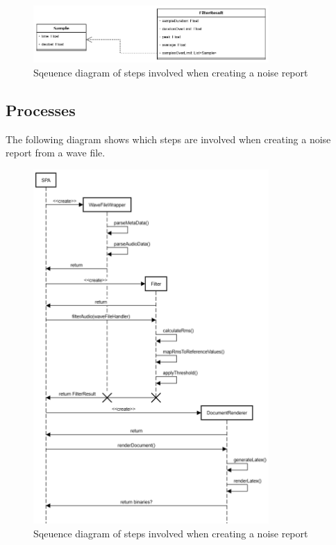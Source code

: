 \begin{figure}[H]
    \centering
    \includegraphics[width=0.8\textwidth]{../assets/interface.png}
    \caption{Sqeuence diagram of steps involved when creating a noise report}
\end{figure}

\subsection{Processes}
The following diagram shows which steps are involved when creating a noise report from a wave file.

\begin{figure}[H]
    \centering
    \includegraphics[width=0.8\textwidth]{../assets/sequence_diagram_from_wave_file_to_pdf.png}
    \caption{Sqeuence diagram of steps involved when creating a noise report}
\end{figure}


